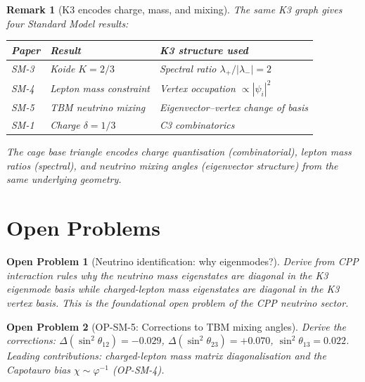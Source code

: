 \documentclass[11pt]{article}
\newtheorem{remark}{Remark}[section]
\newtheorem{openproblem}{Open Problem}
\newcommand{\phig}{\varphi}
\begin{document}
\begin{remark}[K3 encodes charge, mass, and mixing]
The same K3 graph gives four Standard Model results:

\begin{center}
\renewcommand{\arraystretch}{1.3}
\begin{tabular}{lll}
\toprule
Paper & Result & K3 structure used \\
\midrule
SM-3 & Koide $K = 2/3$ & Spectral ratio $\lambda_+/|\lambda_-| = 2$ \\
SM-4 & Lepton mass constraint & Vertex occupation $\propto |\psi_i|^2$ \\
SM-5 & TBM neutrino mixing & Eigenvector--vertex change of basis \\
SM-1 & Charge $\delta = 1/3$ & C3 combinatorics \\
\bottomrule
\end{tabular}
\end{center}

The cage base triangle encodes charge quantisation (combinatorial),
lepton mass ratios (spectral), and neutrino mixing angles
(eigenvector structure) from the same underlying geometry.
\end{remark}

\section{Open Problems}

\begin{openproblem}[Neutrino identification: why eigenmodes?]
\label{op:nu_id}
Derive from CPP interaction rules why the neutrino mass eigenstates
are diagonal in the K3 eigenmode basis while charged-lepton mass
eigenstates are diagonal in the K3 vertex basis.  This is the
foundational open problem of the CPP neutrino sector.
\end{openproblem}

\begin{openproblem}[OP-SM-5: Corrections to TBM mixing angles]
\label{op:corrections}
Derive the corrections:
$\Delta(\sin^2\theta_{12}) = -0.029$,
$\Delta(\sin^2\theta_{23}) = +0.070$,
$\sin^2\theta_{13} = 0.022$.
Leading contributions: charged-lepton mass matrix diagonalisation
and the Capotauro bias $\chi \sim \phig^{-1}$ (OP-SM-4).
\end{openproblem}
\end{document}
